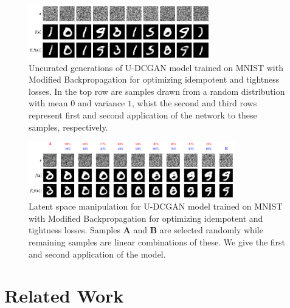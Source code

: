 \documentclass{article}
\theoremstyle{plain}
\theoremstyle{definition}
\theoremstyle{remark}
\begin{document}
\begin{figure}[htbp]
    \centering
    \includegraphics[width=0.7\textwidth]{./resources/modified_0-1_0-1_rand_noise_mapping.png}
    \caption{Uncurated generations of U-DCGAN model trained on MNIST with Modified Backpropagation for optimizing idempotent and tightness losses. In the top row are samples drawn from a random distribution with mean $0$ and variance $1$, whist the second and third rows represent first and second application of the network to these samples, respectively.}
    \label{fig:gen-mnist}
\end{figure}


\begin{figure}[htbp]
    \centering
    \includegraphics[width=0.8\textwidth]{./resources/modified_0-1_0-1_rand_latent_space.png}
    \caption{Latent space manipulation for U-DCGAN model trained on MNIST with Modified Backpropagation for optimizing idempotent and tightness losses. Samples $\mathbf{A}$ and $\mathbf{B}$ are selected randomly while remaining samples are linear combinations of these. We give the first and second application of the model.}
    \label{fig:latent-mnist}
\end{figure}



\section{Related Work}
\label{sec:related}
\end{document}
